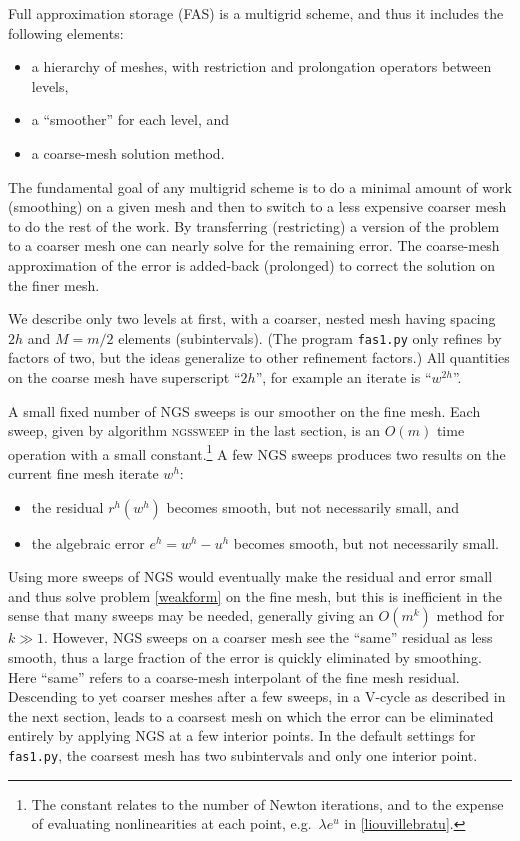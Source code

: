 \documentclass[letterpaper,final,12pt,reqno]{amsart}
\begin{document}
Full approximation storage (FAS) \cite{Brandt1977,Briggsetal2000} is a multigrid scheme, and thus it includes the following elements:
\begin{itemize}
\item a hierarchy of meshes, with restriction and prolongation operators between levels,
\item a ``smoother'' for each level, and
\item a coarse-mesh solution method.
\end{itemize}
The fundamental goal of any multigrid scheme is to do a minimal amount of work (smoothing) on a given mesh and then to switch to a less expensive coarser mesh to do the rest of the work.  By transferring (restricting) a version of the problem to a coarser mesh one can nearly solve for the remaining error.  The coarse-mesh approximation of the error is added-back (prolonged) to correct the solution on the finer mesh.

We describe only two levels at first, with a coarser, nested mesh having spacing $2h$ and $M=m/2$ elements (subintervals).  (The program \texttt{fas1.py} only refines by factors of two, but the ideas generalize to other refinement factors.)  All quantities on the coarse mesh have superscript ``$2h$'', for example an iterate is ``$w^{2h}$''.

A small fixed number of NGS sweeps is our smoother on the fine mesh.  Each sweep, given by algorithm \textsc{ngssweep} in the last section, is an $O(m)$ time operation with a small constant.\footnote{The constant relates to the number of Newton iterations, and to the expense of evaluating nonlinearities at each point, e.g.~$\lambda e^u$ in \eqref{liouvillebratu}.}  A few NGS sweeps produces two results on the current fine mesh iterate $w^h$:
\begin{itemize}
\item the residual $r^h(w^h)$ becomes smooth, but not necessarily small, and
\item the algebraic error $e^h = w^h - u^h$ becomes smooth, but not necessarily small.
\end{itemize}

Using more sweeps of NGS would eventually make the residual and error small and thus solve problem \eqref{weakform} on the fine mesh, but this is inefficient in the sense that many sweeps may be needed, generally giving an $O(m^k)$ method for $k\gg 1$.  However, NGS sweeps on a coarser mesh see the ``same'' residual as less smooth, thus a large fraction of the error is quickly eliminated by smoothing.  Here ``same'' refers to a coarse-mesh interpolant of the fine mesh residual.  Descending to yet coarser meshes after a few sweeps, in a V-cycle as described in the next section, leads to a coarsest mesh on which the error can be eliminated entirely by applying NGS at a few interior points.  In the default settings for \texttt{fas1.py}, the coarsest mesh has two subintervals and only one interior point.
\end{document}
